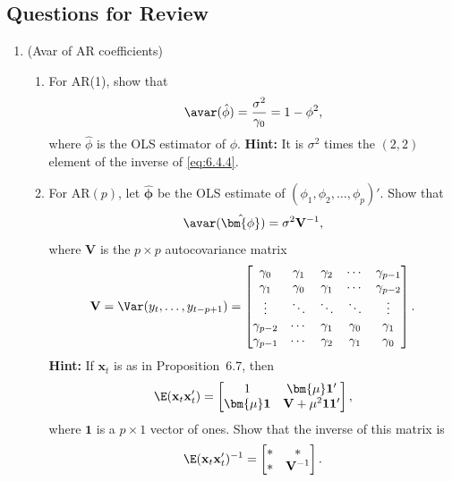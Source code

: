 \subsection*{Questions for Review}

\begin{enumerate}
\item (Avar of AR coefficients)
\begin{enumerate}[label=(\alph*)]
\item For AR(1), show that
\[
  \avar(\hat{\phi}) = \frac{\sigma^2}{\gamma_0} = 1 - \phi^2,
\]
where $\hat{\phi}$ is the OLS estimator of $\phi$. \textbf{Hint:} It is $\sigma^2$ times the $(2, 2)$ element
of the inverse of \eqref{eq:6.4.4}.

\item For $\text{AR}(p)$, let $\hat{\bm{\phi}}$ be the OLS estimate of $(\phi_1, \phi_2, \ldots, \phi_p)'$. Show that
\[
  \avar(\hat{\bm{\phi}}) = \sigma^2 \mathbf{V}^{-1},
\]
where $\mathbf{V}$ is the $p \times p$ autocovariance matrix
\[
  \mathbf{V} = \Var(y_t, \ldots, y_{t-p+1}) =
  \begin{bmatrix}
    \gamma_0 & \gamma_1 & \gamma_2 & \cdots & \gamma_{p-1} \\
    \gamma_1 & \gamma_0 & \gamma_1 & \cdots & \gamma_{p-2} \\
    \vdots & \ddots & \ddots & \ddots & \vdots \\
    \gamma_{p-2} & \cdots & \gamma_1 & \gamma_0 & \gamma_1 \\
    \gamma_{p-1} & \cdots & \gamma_2 & \gamma_1 & \gamma_0
  \end{bmatrix}.
\]
\textbf{Hint:} If $\mathbf{x}_t$ is as in Proposition~6.7, then
\[
  \E(\mathbf{x}_t \mathbf{x}_t') =
  \begin{bmatrix} 1 & \bm{\mu} \mathbf{1}' \\ \bm{\mu} \mathbf{1} & \mathbf{V} + \mu^2 \mathbf{1}\mathbf{1}' \end{bmatrix},
\]
where $\mathbf{1}$ is a $p \times 1$ vector of ones. Show that the inverse of this matrix is
\[
  \E(\mathbf{x}_t \mathbf{x}_t')^{-1} =
  \begin{bmatrix} * & * \\ * & \mathbf{V}^{-1} \end{bmatrix}.
\]
\end{enumerate}
\end{enumerate}
